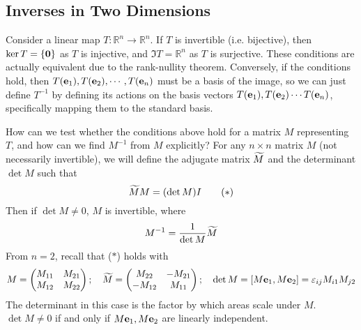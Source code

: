 \subsection{Inverses in Two Dimensions}
Consider a linear map $T\colon \mathbb R^n \to \mathbb R^n$. If $T$ is invertible (i.e. bijective), then $\ker T = \{ \vb 0 \}$ as $T$ is injective, and $\Im T = \mathbb R^n$ as $T$ is surjective. These conditions are actually equivalent due to the rank-nullity theorem. Conversely, if the conditions hold, then $T(\vb e_1), T(\vb e_2), \cdots, T(\vb e_n)$ must be a basis of the image, so we can just define $T^{-1}$ by defining its actions on the basis vectors $T(\vb e_1), T(\vb e_2) \cdots T(\vb e_n)$, specifically mapping them to the standard basis.

How can we test whether the conditions above hold for a matrix $M$ representing $T$, and how can we find $M^{-1}$ from $M$ explicitly? For any $n \times n$ matrix $M$ (not necessarily invertible), we will define the adjugate matrix $\widetilde{M}$ and the determinant $\det M$ such that
\[ \widetilde{M} M = (\det M) I \tag{$\ast$} \]
Then if $\det M \neq 0$, $M$ is invertible, where
\[ M^{-1} = \frac{1}{\det M}\widetilde{M} \]
From $n=2$, recall that ($\ast$) holds with
\[ M = \begin{pmatrix}
		M_{11} & M_{21} \\
		M_{12} & M_{22}
	\end{pmatrix};\quad \widetilde{M} = \begin{pmatrix}
		M_{22}  & -M_{21} \\
		-M_{12} & M_{11}
	\end{pmatrix};\quad \det M = [M\vb e_1, M\vb e_2] = \varepsilon_{ij}M_{i1}M_{j2} \]
The determinant in this case is the factor by which areas scale under $M$. $\det M \neq 0$ if and only if $M\vb e_1, M\vb e_2$ are linearly independent.

